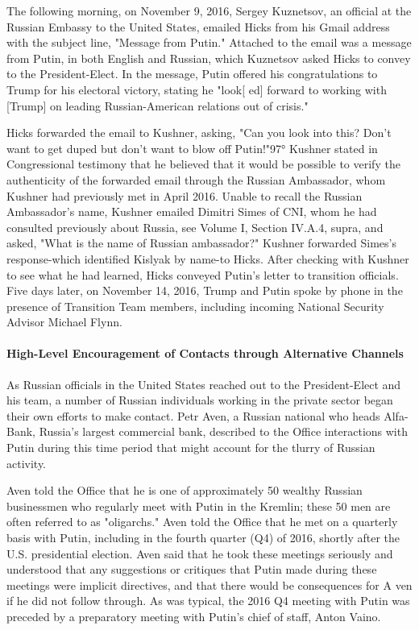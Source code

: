 The following morning, on November 9, 2016, Sergey Kuznetsov, an official at the Russian Embassy to the United States, emailed Hicks from his Gmail address with the subject line, "Message from Putin."%
Attached to the email was a message from Putin, in both English and Russian, which Kuznetsov asked Hicks to convey to the President-Elect.%
In the message, Putin offered his congratulations to Trump for his electoral victory, stating he "look[ ed] forward to working with [Trump] on leading Russian-American relations out of crisis."%

Hicks forwarded the email to Kushner, asking, "Can you look into this? Don't want to get duped but don't want to blow off Putin!"97° Kushner stated in Congressional testimony that he believed that it would be possible to verify the authenticity of the forwarded email through the Russian Ambassador, whom Kushner had previously met in April 2016.%
Unable to recall the Russian Ambassador's name, Kushner emailed Dimitri Simes of CNI, whom he had consulted previously about Russia, see Volume I, Section IV.A.4, supra, and asked, "What is the name of Russian ambassador?"%
Kushner forwarded Simes's response-which identified Kislyak by name-to Hicks.%
After checking with Kushner to see what he had learned, Hicks conveyed Putin's letter to transition officials.%
Five days later, on November 14, 2016, Trump and Putin spoke by phone in the presence of Transition Team members, including incoming National Security Advisor Michael Flynn.%

\paragraph{High-Level Encouragement of Contacts through Alternative Channels}

As Russian officials in the United States reached out to the President-Elect and his team, a number of Russian individuals working in the private sector began their own efforts to make contact. Petr Aven, a Russian national who heads Alfa-Bank, Russia's largest commercial bank, described to the Office interactions with Putin during this time period that might account for the tlurry of Russian activity.%

Aven told the Office that he is one of approximately 50 wealthy Russian businessmen who regularly meet with Putin in the Kremlin; these 50 men are often referred to as "oligarchs."%
Aven told the Office that he met on a quarterly basis with Putin, including in the fourth quarter (Q4) of 2016, shortly after the U.S. presidential election.%
Aven said that he took these meetings seriously and understood that any suggestions or critiques that Putin made during these meetings were implicit directives, and that there would be consequences for A ven if he did not follow through.%
As was typical, the 2016 Q4 meeting with Putin was preceded by a preparatory meeting with Putin's chief of staff, Anton Vaino.%

